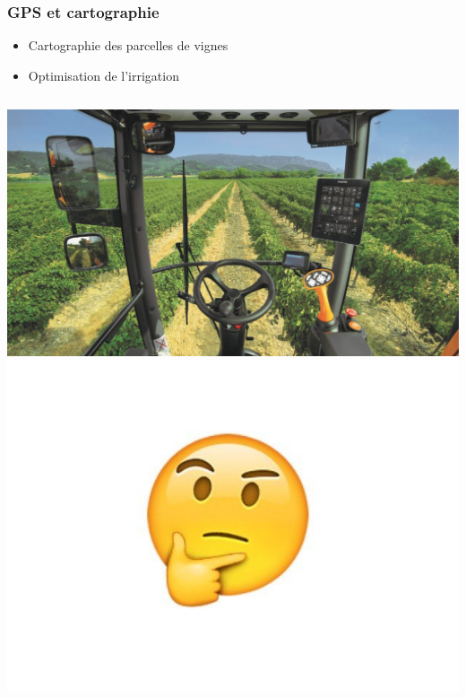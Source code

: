 \documentclass{beamer}
\begin{document}
	
	\begin{frame}
		\frametitle{GPS et cartographie}
		\begin{itemize}
				\item Cartographie des parcelles de vignes
				\item Optimisation de l'irrigation
		\end{itemize}

	\begin{columns}[c]
		\centering
		\includegraphics[width=\textwidth]{gps}
		\centering
		\includegraphics[width=\textwidth]{1}
	\end{columns}
	\end{frame}
\end{document}
